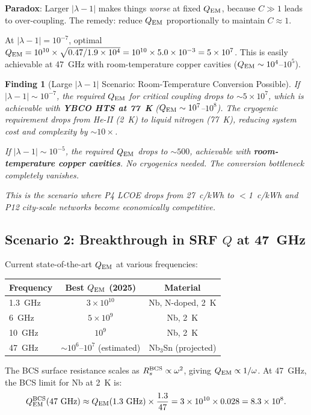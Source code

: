\documentclass[11pt]{article}
\newtheorem{finding}{Finding}
\newcommand{\ee}[1]{\times 10^{#1}}
\newcommand{\lambdaone}{|\lambda{-}1|}
\newcommand{\QEM}{Q_{\rm EM}}
\begin{document}
\textbf{Paradox}: Larger $\lambdaone$ makes things \emph{worse} at
fixed $\QEM$, because $C \gg 1$ leads to over-coupling. The remedy:
reduce $\QEM$ proportionally to maintain $C \approx 1$.

At $\lambdaone = 10^{-7}$, optimal $\QEM = 10^{10}\times\sqrt{0.47/1.9\ee{4}}
= 10^{10}\times 5.0\ee{-3} = 5\ee{7}$. This is easily achievable at
47~GHz with room-temperature copper cavities ($\QEM \sim 10^4$--$10^5$).

\begin{finding}[Large $\lambdaone$ Scenario: Room-Temperature Conversion Possible]
\label{find:large-lambda}
If $\lambdaone \sim 10^{-7}$, the required $\QEM$ for critical coupling
drops to $\sim 5\ee{7}$, which is achievable with \textbf{YBCO HTS at
77~K} ($\QEM \sim 10^{7}$--$10^{8}$). The cryogenic requirement drops
from He-II (2~K) to liquid nitrogen (77~K), reducing system cost and
complexity by $\sim 10\times$.

If $\lambdaone \sim 10^{-5}$, the required $\QEM$ drops to $\sim 500$,
achievable with \textbf{room-temperature copper cavities}. No
cryogenics needed. The conversion bottleneck completely vanishes.

This is the scenario where P4 LCOE drops from 27~c/kWh to $<$1~c/kWh
and P12 city-scale networks become economically competitive.
\end{finding}

\subsection{Scenario 2: Breakthrough in SRF $Q$ at 47~GHz}

Current state-of-the-art $\QEM$ at various frequencies:
\begin{center}
\begin{tabular}{lcc}
\toprule
Frequency & Best $\QEM$ (2025) & Material \\
\midrule
1.3~GHz & $3\ee{10}$ & Nb, N-doped, 2~K \\
6~GHz & $5\ee{9}$ & Nb, 2~K \\
10~GHz & $10^{9}$ & Nb, 2~K \\
47~GHz & $\sim 10^{6}$--$10^{7}$ (estimated) & Nb$_3$Sn (projected) \\
\bottomrule
\end{tabular}
\end{center}

The BCS surface resistance scales as $R_s^{\rm BCS} \propto \omega^2$,
giving $\QEM \propto 1/\omega$. At 47~GHz, the BCS limit for Nb at 2~K is:
\begin{equation}
\QEM^{\rm BCS}(47~\text{GHz}) \approx \QEM(1.3~\text{GHz})\times
\frac{1.3}{47} = 3\ee{10}\times 0.028 = 8.3\ee{8}.
\end{equation}
\end{document}
